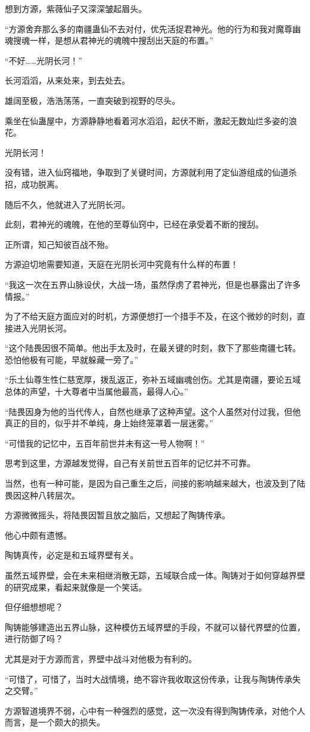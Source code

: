 \begin{this_body}
想到方源，紫薇仙子又深深皱起眉头。

“方源舍弃那么多的南疆蛊仙不去对付，优先活捉君神光。他的行为和我对魔尊幽魂搜魂一样，是想从君神光的魂魄中搜刮出天庭的布置。”

“不好……光阴长河！”

长河滔滔，从来处来，到去处去。

雄阔至极，浩浩荡荡，一直突破到视野的尽头。

乘坐在仙蛊屋中，方源静静地看着河水滔滔，起伏不断，激起无数灿烂多姿的浪花。

光阴长河！

没有错，进入仙窍福地，争取到了关键时间，方源就利用了定仙游组成的仙道杀招，成功脱离。

随后不久，他就进入了光阴长河。

此刻，君神光的魂魄，在他的至尊仙窍中，已经在承受着不断的搜刮。

正所谓，知己知彼百战不殆。

方源迫切地需要知道，天庭在光阴长河中究竟有什么样的布置！

“我这一次在五界山脉设伏，大战一场，虽然俘虏了君神光，但是也暴露出了许多情报。”

为了不给天庭方面应对的时机，方源便想打一个措手不及，在这个微妙的时刻，直接进入光阴长河。

“这个陆畏因很不简单。他出手太及时，在最关键的时刻，救下了那些南疆七转。恐怕他极有可能，早就躲藏一旁了。”

“乐土仙尊生性仁慈宽厚，拨乱返正，弥补五域幽魂创伤。尤其是南疆，要论五域总体的声望，十大尊者中当属他最高，最得人心。”

“陆畏因身为他的当代传人，自然也继承了这种声望。这个人虽然对付过我，但他真正的目的，似乎并不单纯，身上始终笼罩着一层迷雾。”

“可惜我的记忆中，五百年前世并未有这一号人物啊！”

思考到这里，方源越发觉得，自己有关前世五百年的记忆并不可靠。

当然，也有一种可能，是因为自己重生之后，间接的影响越来越大，也波及到了陆畏因这种八转层次。

方源微微摇头，将陆畏因暂且放之脑后，又想起了陶铸传承。

他心中颇有遗憾。

陶铸真传，必定是和五域界壁有关。

虽然五域界壁，会在未来相继消散无踪，五域联合成一体。陶铸对于如何穿越界壁的研究成果，看起来就像是一个笑话。

但仔细想想呢？

陶铸能够建造出五界山脉，这种模仿五域界壁的手段，不就可以替代界壁的位置，进行防御了吗？

尤其是对于方源而言，界壁中战斗对他极为有利的。

“可惜了，可惜了，当时大战情境，绝不容许我收取这份传承，让我与陶铸传承失之交臂。”

方源智道境界不弱，心中有一种强烈的感觉，这一次没有得到陶铸传承，对他个人而言，是一个颇大的损失。

\end{this_body}

